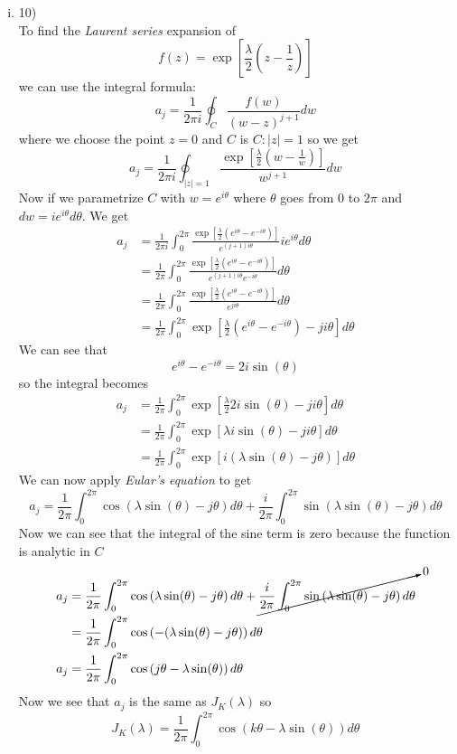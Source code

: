 \documentclass[11pt]{article}
\begin{document}
\begin{enumerate}
\begin{enumerate}[(i)]
\item 10)\\
To find the \emph{Laurent series} expansion of
$$f(z) = \exp\left[\frac{\lambda}{2}\left(z-\frac{1}{z}\right)\right]$$
we can use the integral formula:
$$a_j = \frac{1}{2\pi i}\oint_{C}\frac{f(w)}{(w-z)^{j+1}}dw$$
where we choose the point $z=0$ and $C$ is $C:|z|=1$ so we get
$$a_j = \frac{1}{2\pi i}\oint_{|z|=1}\frac{\exp\left[\frac{\lambda}{2}\left(w-\frac{1}{w}\right)\right]}{w^{j+1}}dw$$
Now if we parametrize $C$ with $w = e^{i\theta}$ where $\theta$ goes from $0$ to $2\pi$ and $dw = ie^{i\theta}d\theta$. We get
\begin{align*}
a_j &= \frac{1}{2\pi i}\int_0^{2\pi}\frac{\exp\left[\frac{\lambda}{2}\left(e^{i\theta} - e^{-i\theta}\right)\right]}{e^{(j+1)i\theta}}ie^{i\theta}d\theta\\
&= \frac{1}{2\pi}\int_0^{2\pi}\frac{\exp\left[\frac{\lambda}{2}\left(e^{i\theta} - e^{-i\theta}\right)\right]}{e^{(j+1)i\theta}e^{-i\theta}}d\theta\\
&= \frac{1}{2\pi}\int_0^{2\pi}\frac{\exp\left[\frac{\lambda}{2}\left(e^{i\theta} - e^{-i\theta}\right)\right]}{e^{ji\theta}}d\theta\\
&= \frac{1}{2\pi}\int_0^{2\pi}\exp\left[\frac{\lambda}{2}\left(e^{i\theta} - e^{-i\theta}\right) - ji\theta\right]d\theta
\end{align*}
We can see that 
$$e^{i\theta}-e^{-i\theta} = 2i\sin(\theta)$$
so the integral becomes
\begin{align*}
a_j &= \frac{1}{2\pi}\int_0^{2\pi}\exp\left[\frac{\lambda}{2}2i\sin(\theta) - ji\theta\right]d\theta\\
&= \frac{1}{2\pi}\int_0^{2\pi}\exp\left[\lambda i\sin(\theta) - ji\theta\right]d\theta\\
&= \frac{1}{2\pi}\int_0^{2\pi}\exp\left[i(\lambda\sin(\theta) - j\theta)\right]d\theta
\end{align*}
We can now apply \emph{Eular's equation} to get
$$a_j = \frac{1}{2\pi}\int_0^{2\pi}\cos\left(\lambda\sin(\theta) - j\theta\right)d\theta + \frac{i}{2\pi}\int_0^{2\pi}\sin\left(\lambda\sin(\theta) - j\theta\right)d\theta$$
Now we can see that the integral of the sine term is zero because the function is analytic in $C$
\begin{align*}
a_j &= \frac{1}{2\pi}\int_0^{2\pi}\cos\left(\lambda\sin(\theta) - j\theta\right)d\theta + \cancelto{0}{\frac{i}{2\pi}\int_0^{2\pi}\sin\left(\lambda\sin(\theta) - j\theta\right)d\theta}\\
&= \frac{1}{2\pi}\int_0^{2\pi}\cos\left(-(\lambda\sin(\theta) - j\theta)\right)d\theta\\
a_j &= \frac{1}{2\pi}\int_0^{2\pi}\cos\left(j\theta -\lambda\sin(\theta)\right)d\theta\\
\end{align*}
Now we see that $a_j$ is the same as $J_K(\lambda)$ so 
$$J_K(\lambda) =  \frac{1}{2\pi}\int_0^{2\pi}\cos\left(k\theta -\lambda\sin(\theta)\right)d\theta$$


\end{enumerate}
\end{enumerate}
\end{document}
